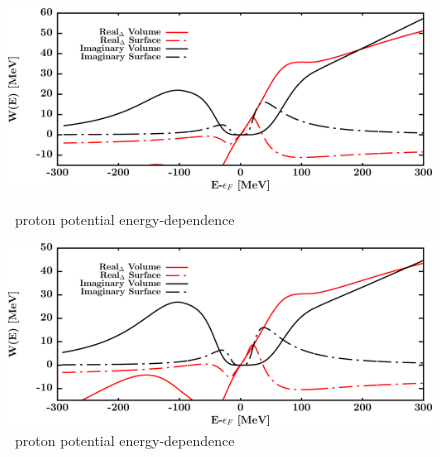 \begin{figure}[H]
    \centering
    \begin{minipage}{0.45\textwidth}
        \centering
        \includegraphics[width=1.0\textwidth]{figures/ni64_protonPotentials.png}
        \caption{\niFour\ proton potential energy-dependence}
        \label{DOMFitData_ni64_proton_potentialComponent_energy}
    \end{minipage}\hfill
    \begin{minipage}{0.45\textwidth}
        \centering
        \includegraphics[width=1.0\textwidth]{figures/ni64_neutronPotentials.png}
        \caption{\niFour\ proton potential energy-dependence}
        \label{DOMFitData_ni64_neutron_potentialComponent_energy}
    \end{minipage}
\end{figure}

